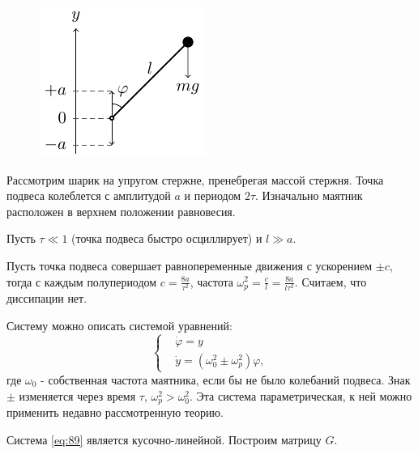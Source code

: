 
\begin{figure} 
\vspace{0.15em}
\centering
\includegraphics[scale=1.5]{img/kap_pendulum/kap_pendulum}
\end{figure}
Рассмотрим шарик на упругом стержне, пренебрегая массой стержня. Точка подвеса колеблется с амплитудой $a$ и периодом $2\tau$. Изначально маятник расположен в верхнем положении равновесия. 


Пусть $\tau \ll 1$ (точка подвеса быстро осциллирует) и $l\gg a$.

Пусть точка подвеса совершает равнопеременные движения с ускорением $\pm c$, тогда с каждым полупериодом $c=\frac{8a}{\tau^2}$, частота $\omega_p^2=\frac{c}{l}=\frac{8a}{l\tau^2}$. Считаем, что диссипации нет. 

Систему можно описать системой уравнений:
\begin{equation}
	\left\{\begin{aligned}
		&\dot{\varphi}=y \\
		&\dot{y}=(\omega_0^2 \pm \omega_p^2)	\varphi,
	\end{aligned}\right.
	\label{eq:89}	
\end{equation}
где $\omega_0$ - собственная частота маятника, если бы не было колебаний подвеса. Знак $\pm$ изменяется через время $\tau$, $\omega_p^2>\omega_0^2$. Эта система параметрическая, к ней можно применить недавно рассмотренную теорию. 

Система  \eqref{eq:89} является кусочно-линейной. Построим матрицу $G$.

